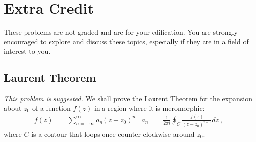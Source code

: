 \documentclass[12pt]{article}
\numberwithin{equation}{subsection}    %
\begin{document}





\section{Extra Credit}

These problems are not graded and are for your edification. You are strongly encouraged to explore and discuss these topics, especially if they are in a field of interest to you.


\subsection{Laurent Theorem}

\emph{This problem is suggested.} 
We shall prove the Laurent Theorem for the expansion about $z_0$ of a function $f(z)$ in a region where it is meromorphic:
\begin{align}
f(z) &= \sum_{n=-\infty}^{\infty} a_n (z-z_0)^n
&
a_n &= \frac{1}{2\pi i} \oint_C \frac{f(z)}{(z-z_0)^{n+1}} dz \ ,
\end{align}
where $C$ is a contour that loops once counter-clockwise around $z_0$.
\end{document}
